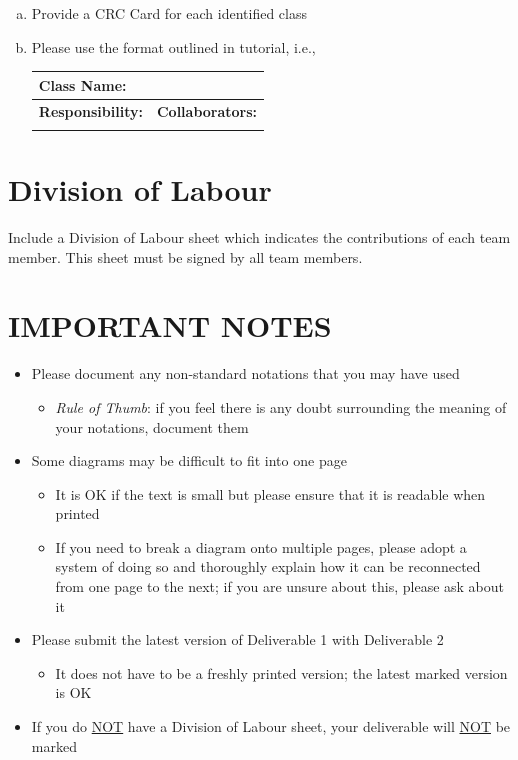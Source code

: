 \documentclass[]{article}
\begin{document}
\begin{enumerate}[a)]
	\item Provide a CRC Card for each identified class
	\item Please use the format outlined in tutorial, i.e., 
	\begin{table}[ht]
		\centering
		\begin{tabular}{|p{5cm}|p{5cm}|}
		\hline 
		 \multicolumn{2}{|l|}{\textbf{Class Name:}} \\
		\hline
		\textbf{Responsibility:} & \textbf{Collaborators:} \\
		\hline
		\vspace{1in} & \\
		\hline
		\end{tabular}
	\end{table}
	
\end{enumerate}

\appendix
\section{Division of Labour}
\label{sec:division_of_labour}
Include a Division of Labour sheet which indicates the contributions of each team member. This sheet must be signed by all team members.

\newpage
\section*{IMPORTANT NOTES}
\begin{itemize}
	\item Please document any non-standard notations that you may have used
	\begin{itemize}
		\item \emph{Rule of Thumb}: if you feel there is any doubt surrounding the meaning of your notations, document them
	\end{itemize}
	\item Some diagrams may be difficult to fit into one page
	\begin{itemize}
		\item It is OK if the text is small but please ensure that it is readable when printed
		\item If you need to break a diagram onto multiple pages, please adopt a system of doing so and thoroughly explain how it can be reconnected from one page to the next; if you are unsure about this, please ask about it
	\end{itemize}
	\item Please submit the latest version of Deliverable 1 with Deliverable 2
	\begin{itemize}
		\item It does not have to be a freshly printed version; the latest marked version is OK
	\end{itemize}
	\item If you do \underline{NOT} have a Division of Labour sheet, your deliverable will \underline{NOT} be marked
\end{itemize}
\end{document}

